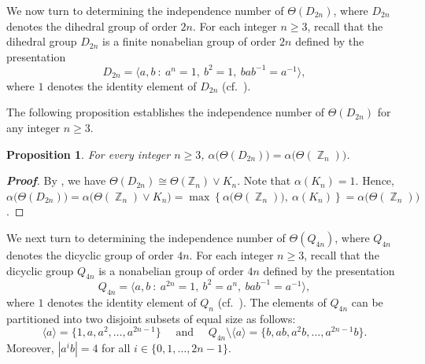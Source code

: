 \documentclass{amsart}
\theoremstyle{plain}
\newtheorem{proposition}[theorem]{Proposition}
\theoremstyle{definition}
\DeclareMathOperator{\Z}{\mathbb{Z}}
\begin{document}

We now turn to determining the independence number of $\Theta(D_{2n})$, where $D_{2n}$ denotes the dihedral group of order $2n$. For each integer $n\geq 3$, recall that the dihedral group $D_{2n}$ is a finite nonabelian group of order $2n$ defined by the presentation \[D_{2n} = \bigl\langle a, b \ \colon \ a^n =1,\  b^2=1, \ bab^{-1}= a^{-1}\bigr\rangle,\] where $1$ denotes the identity element of $D_{2n}$ (cf.~\cite[p.~181]{james-b01}). 

\vspace{0.5mm}

The following proposition establishes the independence number of $\Theta(D_{2n})$ for any integer $n\geq 3$.

\begin{proposition}
For every integer $n\geq 3$,  $\alpha\bigl(\Theta(D_{2n})\bigr)=\alpha\bigl(\Theta(\Z_n)\bigr)$. 
\end{proposition}

\begin{proof}[\textbf{Proof}]
By \cite[Lemma~5.2]{shubh-arxiv25}, we have $\Theta(D_{2n})\cong\Theta(\mathbb{Z}_n)\vee K_n$. Note that $\alpha(K_n)= 1$. Hence,
$\alpha\bigl(\Theta(D_{2n})\bigr)= \alpha\bigl(\Theta(\Z_n)\vee K_n\bigr) = \max\left\{\alpha\bigl(\Theta(\Z_n)\bigr),\ \alpha(K_n)\right\} = \alpha\bigl(\Theta(\Z_n)\bigr)$.
\end{proof}


We next turn to determining the independence number of $\Theta(Q_{4n})$, where $Q_{4n}$ denotes the dicyclic group of order $4n$. For each integer $n\geq 3$, recall that the dicyclic group $Q_{4n}$ is a nonabelian group of order $4n$ defined by the presentation \[Q_{4n} = \bigl\langle a, b \ \colon \ a^{2n} = 1,\ b^2 = a^n,\ bab^{-1} = a^{-1}\rangle,\] where $1$ denotes the identity element of $Q_{n}$ (cf.~\cite[p~178]{james-b01}). The elements of $Q_{4n}$ can be partitioned into two disjoint subsets of equal size as follows:
\[\langle a \rangle = \bigl\{1,a,a^2, \ldots, a^{2n-1}\bigr\} \quad \text{ and } \quad Q_{4n}\setminus \langle a \rangle = \bigl\{b,ab,a^2b, \ldots, a^{2n-1}b\bigr\}.\]
Moreover, $|a^ib| = 4$ for all $i\in \{0,1,\ldots, 2n-1\}$.


\vspace{0.5mm}
\end{document}

